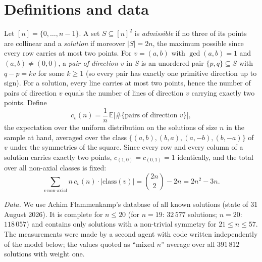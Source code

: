 \documentclass[11pt,a4paper]{article}
\begin{document}
\section{Definitions and data}
Let $[n]=\{0,\dots,n-1\}$.  A set $S\subseteq[n]^2$ is \emph{admissible} if no three of its points are collinear
and a \emph{solution} if moreover $|S|=2n$, the maximum possible since every row carries at most two points.  For
$v=(a,b)$ with $\gcd(a,b)=1$ and $(a,b)\ne(0,0)$, a \emph{pair of direction $v$} in $S$ is an unordered pair
$\{p,q\}\subseteq S$ with $q-p=kv$ for some $k\ge1$ (so every pair has exactly one primitive direction up to sign).
For a solution, every line carries at most two points, hence the number of pairs of direction $v$ equals the number of
lines of direction $v$ carrying exactly two points.  Define
\[c_v(n)=\frac{1}{n}\,\mathbb{E}\bigl[\#\{\text{pairs of direction }v\}\bigr],\]
the expectation over the uniform distribution on the solutions of size $n$ in the sample at hand, averaged over the
class $\{(a,b),(b,a),(a,-b),(b,-a)\}$ of $v$ under the symmetries of the square.  Since every row and every column of a
solution carries exactly two points, $c_{(1,0)}=c_{(0,1)}=1$ identically, and the total over all non-axial classes
is fixed:
\begin{equation}\label{eq:total}
\sum_{v\ \text{non-axial}} n\,c_v(n)\cdot|\text{class}(v)| = \binom{2n}{2}-2n = 2n^2-3n .
\end{equation}

\emph{Data.}  We use Achim Flammenkamp's database of all known solutions (state of 31 August 2026).  It is complete
for $n\le20$ (for $n=19$: $32\,577$ solutions; $n=20$: $118\,057$) and contains only solutions with a non-trivial
symmetry for $21\le n\le57$.  The measurements were made by a second agent with code written independently of the
model below; the values quoted as ``mixed $n$'' average over all $391\,812$ solutions with weight one.
\end{document}

